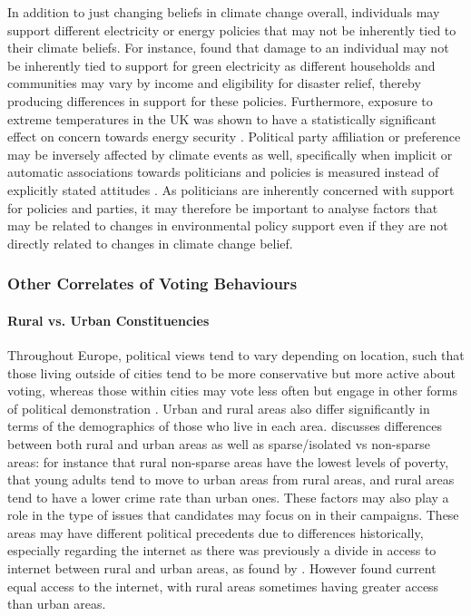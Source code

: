 \documentclass[preprint,12pt,authoryear]{elsarticle}
\begin{document}
In addition to just changing beliefs in climate change overall, individuals may support different electricity or energy policies that may not be inherently tied to their climate beliefs. For instance, \citet{osberghausCausalEffectFlood2019} found that damage to an individual may not be inherently tied to support for green electricity as different households and communities may vary by income and eligibility for disaster relief, thereby producing differences in support for these policies. Furthermore, exposure to extreme temperatures in the UK was shown to have a statistically significant effect on concern towards energy security \citep{larcomUKSummerHeatwave2019a}. Political party affiliation or preference may be inversely affected by climate events as well, specifically when implicit or automatic associations towards politicians and policies is measured instead of explicitly stated attitudes \citep{rudmanWhenTruthPersonally2013a}. As politicians are inherently concerned with support for policies and parties, it may therefore be important to analyse factors that may be related to changes in environmental policy support even if they are not directly related to changes in climate change belief. 



\subsubsection{Other Correlates of Voting Behaviours}

\paragraph{Rural vs. Urban Constituencies}

Throughout Europe, political views tend to vary depending on location, such that those living outside of cities tend to be more conservative but more active about voting, whereas those within cities may vote less often but engage in other forms of political demonstration \citep{kennyUrbanruralPolarisationPolitical2021}. Urban and rural areas also differ significantly in terms of the demographics of those who live in each area. \citet{patemanRuralUrbanAreas2011} discusses differences between both rural and urban areas as well as sparse/isolated vs non-sparse areas: for instance that rural non-sparse areas have the lowest levels of poverty, that young adults tend to move to urban areas from rural areas, and rural areas tend to have a lower crime rate than urban ones. These factors may also play a role in the type of issues that candidates may focus on in their campaigns. These areas may have different political precedents due to differences historically, especially regarding the internet as there was previously a divide in access to internet between rural and urban areas, as found by \citet{choudrieRealisingGovernmentUK2005}. However \citet{patemanRuralUrbanAreas2011} found current equal access to the internet, with rural areas sometimes having greater access than urban areas.
\end{document}
